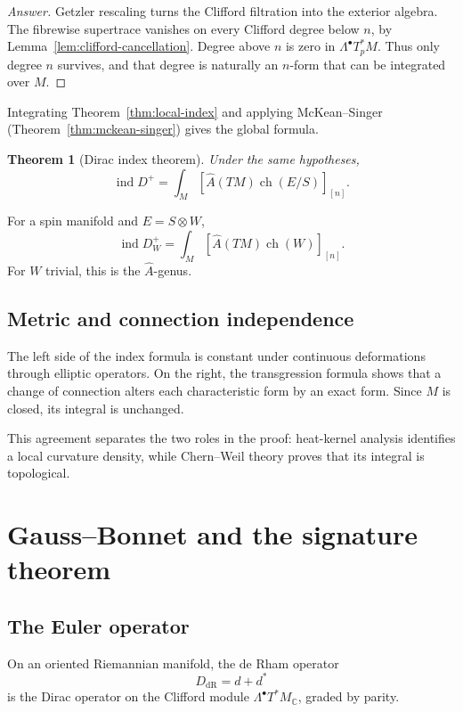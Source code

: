 \documentclass[11pt,oneside,reqno]{book}
\DeclareMathOperator{\ind}{ind}
\newcommand{\C}{\mathbb C}
\newcommand{\Ahat}{\widehat A}
\theoremstyle{plain}
\newtheorem{theorem}{Theorem}[chapter]
\theoremstyle{definition}
\theoremstyle{remark}
\newenvironment{answer}{\begin{proof}[Answer]}{\end{proof}}
\begin{document}
\begin{answer}
Getzler rescaling turns the Clifford filtration into the exterior algebra.
The fibrewise supertrace vanishes on every Clifford degree below \(n\), by
Lemma~\ref{lem:clifford-cancellation}. Degree above \(n\) is zero in
\(\Lambda^\bullet T_p^*M\). Thus only degree \(n\) survives, and that degree
is naturally an \(n\)-form that can be integrated over \(M\).
\end{answer}

Integrating Theorem~\ref{thm:local-index} and applying McKean--Singer
(Theorem~\ref{thm:mckean-singer}) gives the global formula.

\begin{theorem}[Dirac index theorem]\label{thm:dirac-index}
Under the same hypotheses,
\[
 \boxed{
 \ind D^+
 =
 \int_M
 \left[
 \Ahat(TM)
 \operatorname{ch}(E/S)
 \right]_{[n]}.
 }
\]
\end{theorem}

For a spin manifold and \(E=S\otimes W\),
\[
 \ind D_W^+
 =
 \int_M
 \left[
 \Ahat(TM)\operatorname{ch}(W)
 \right]_{[n]}.
\]
For \(W\) trivial, this is the \(\Ahat\)-genus.

\section{Metric and connection independence}

The left side of the index formula is constant under continuous
deformations through elliptic operators. On the right, the transgression
formula shows that a change of connection alters each characteristic form
by an exact form. Since \(M\) is closed, its integral is unchanged.

This agreement separates the two roles in the proof: heat-kernel analysis
identifies a local curvature density, while Chern--Weil theory proves that
its integral is topological.


\chapter{Gauss--Bonnet and the signature theorem}

\section{The Euler operator}

On an oriented Riemannian manifold, the de Rham operator
\[
 D_{\mathrm{dR}}=d+d^*
\]
is the Dirac operator on the Clifford module
\(\Lambda^\bullet T^*M_\C\), graded by parity.
\end{document}

